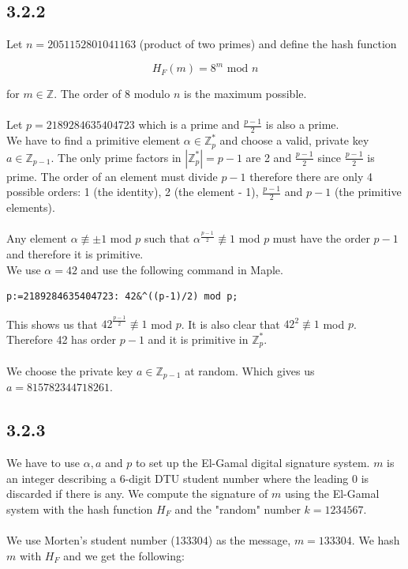 \documentclass[11pt]{report}
\begin{document}
\subsection*{3.2.2}
Let $n = 2051152801041163$ (product of two primes) and define the hash function

$$H_F(m) = 8^m \text{ mod } n$$

for $m \in \mathbb{Z}$. The order of 8 modulo $n$ is the maximum possible.\\
\\
Let $p = 2189284635404723$ which is a prime and $\frac{p-1}{2}$ is also a prime.\\
We have to find a primitive element $\alpha \in \mathbb{Z}^*_p$ and choose a valid, private key $a \in \mathbb{Z}_{p-1}$.
The only prime factors in $|\mathbb{Z}^*_p| = p - 1$ are 2 and $\frac{p-1}{2}$ since $\frac{p-1}{2}$ is prime. The order of an element must divide $p - 1$ therefore there are only 4 possible orders: 1 (the identity), 2 (the element - 1), $\frac{p-1}{2}$ and $p - 1$ (the primitive elements).\\
\\
Any element $\alpha \not\equiv \pm 1$ mod $p$ such that $\alpha^{\frac{p-1}{2}} \not\equiv 1$ mod $p$ must have the order $p - 1$ and therefore it is primitive.\\
We use $\alpha = 42$ and use the following command in Maple.
\begin{lstlisting}[style=Maple]
p:=2189284635404723: 42&^((p-1)/2) mod p;
\end{lstlisting}
This shows us that $42^{\frac{p-1}{2}} \not\equiv 1$ mod $p$. It is also clear that $42^2 \not\equiv 1$ mod $p$. Therefore 42 has order $p - 1$ and it is primitive in $\mathbb{Z}^*_p$.\\
\\
We choose the private key $a \in \mathbb{Z}_{p-1}$ at random. Which gives us $a = 815782344718261$.

\subsection*{3.2.3}
We have to use $\alpha, a$ and $p$ to set up the El-Gamal digital signature system. $m$ is an integer describing a 6-digit DTU student number where the leading 0 is discarded if there is any. We compute the signature of $m$ using the El-Gamal system with the hash function $H_F$ and the "random" number $k = 1234567$.\\
\\
We use Morten's student number (133304) as the message, $m = 133304$. We hash $m$ with $H_F$ and we get the following:
\end{document}
